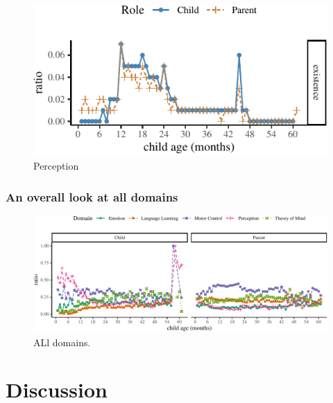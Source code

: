 \documentclass[10pt, letterpaper]{article}
\newenvironment{CodeChunk}{}{}
\begin{document}
\begin{CodeChunk}
\begin{figure}[H]

{\centering \includegraphics{figs/perception-1} 

}

\caption[Perception]{Perception}\label{fig:perception}
\end{figure}
\end{CodeChunk}

\hypertarget{an-overall-look-at-all-domains}{%
\subsubsection{An overall look at all
domains}\label{an-overall-look-at-all-domains}}

\begin{figure}[h]
\begin{CodeChunk}


\begin{center}\includegraphics{figs/all-1} \end{center}

\end{CodeChunk}
\caption[This image spans both columns]{ALl domains.}\label{fig:all}
\end{figure}

\hypertarget{discussion}{%
\section{Discussion}\label{discussion}}
\end{document}
